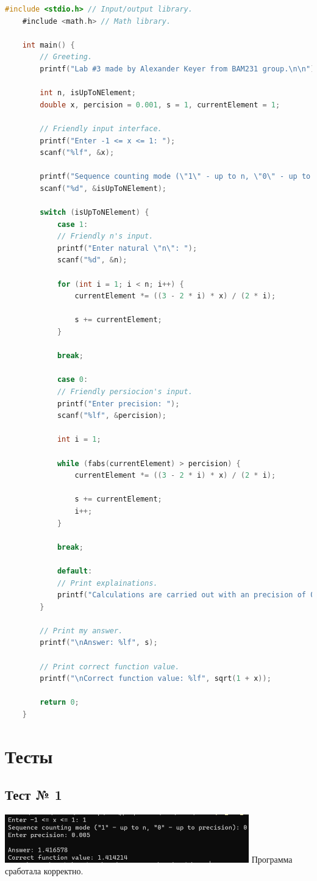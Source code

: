 \documentclass[12pt]{article}
\begin{document}
	\begin{lstlisting}[language=C]
	#include <stdio.h> // Input/output library.
	#include <math.h> // Math library.
	
	int main() {
		// Greeting.
		printf("Lab #3 made by Alexander Keyer from BAM231 group.\n\n");
		
		int n, isUpToNElement;
		double x, percision = 0.001, s = 1, currentElement = 1;
		
		// Friendly input interface.
		printf("Enter -1 <= x <= 1: ");
		scanf("%lf", &x);
		
		printf("Sequence counting mode (\"1\" - up to n, \"0\" - up to precision): ");
		scanf("%d", &isUpToNElement);
		
		switch (isUpToNElement) {
			case 1:
			// Friendly n's input.
			printf("Enter natural \"n\": ");
			scanf("%d", &n);
			
			for (int i = 1; i < n; i++) {
				currentElement *= ((3 - 2 * i) * x) / (2 * i);
				
				s += currentElement;
			}
			
			break;
			
			case 0:
			// Friendly persiocion's input.
			printf("Enter precision: ");
			scanf("%lf", &percision);
			
			int i = 1;
			
			while (fabs(currentElement) > percision) {
				currentElement *= ((3 - 2 * i) * x) / (2 * i);
				
				s += currentElement;
				i++;
			}
			
			break;
			
			default:
			// Print explainations.
			printf("Calculations are carried out with an precision of 0.001\n");
		}
		
		// Print my answer.
		printf("\nAnswer: %lf", s);
		
		// Print correct function value.
		printf("\nCorrect function value: %lf", sqrt(1 + x));
		
		return 0;
	}
	\end{lstlisting}
	
	\newpage
	
	\section*{Тесты}
	
	\subsection*{Тест № 1}
	\includegraphics[width=400px]{test_1}
	Программа сработала корректно.
	
\end{document}
